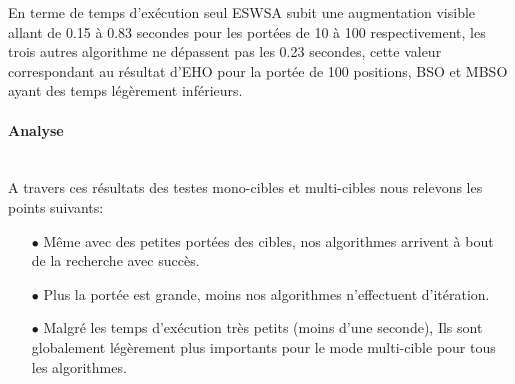 	En terme de temps d'exécution seul ESWSA subit une augmentation visible allant de 0.15 à 0.83 secondes pour les portées de 10 à 100 respectivement,  les trois autres algorithme ne dépassent pas les 0.23 secondes, cette valeur correspondant au résultat d'EHO pour la portée de 100 positions, BSO et MBSO ayant des temps légèrement inférieurs.



\vspace{-0.7cm}
\paragraph{}
\hspace{-0.5cm}
\begin{minipage}[t]{0.55\textwidth}
	\captionsetup{width=0.8\linewidth}
	\centering{}
	\label{IP5}
\end{minipage}\hfill
\hspace{-0.5cm}
\begin{minipage}[t]{0.55\textwidth}
	\captionsetup{width=0.8\linewidth}
	\centering{}
	\label{tP5}
\end{minipage}\hfill




\paragraph{Analyse}
\textbf{ }\\
A travers ces résultats des testes mono-cibles et multi-cibles nous relevons les points suivants:

\begin{itemize}
	\item[$\bullet$] Même avec des petites portées des cibles, nos algorithmes arrivent à bout de la recherche avec succès.
	
	\item[$\bullet$] Plus la portée est grande, moins nos algorithmes n'effectuent d'itération. 
	
	\item[$\bullet$] Malgré les temps d'exécution très petits (moins d'une seconde), Ils sont globalement légèrement plus importants pour le mode multi-cible pour tous les algorithmes.
\end{itemize}









